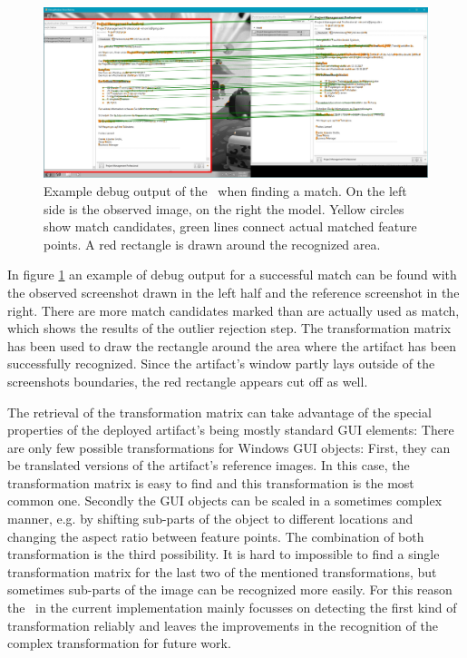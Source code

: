 \begin{figure}[h!]
	\centering
	\includegraphics[scale=0.23]{fig/example-debug-output.jpg}
	\caption{Example debug output of the \vd~when finding a match. On the left side is the observed image, on the right the model. Yellow circles show match candidates, green lines connect actual matched feature points. A red rectangle is drawn around the recognized area.}\label{fig:example-debug-output}
\end{figure}

In figure \ref{fig:example-debug-output} an example of debug output for a successful match can be found with the observed screenshot drawn in the left half and the reference screenshot in the right. There are more match candidates marked than are actually used as match, which shows the results of the outlier rejection step. The transformation matrix has been used to draw the rectangle around the area where the artifact has been successfully recognized. Since the artifact's window partly lays outside of the screenshots boundaries, the red rectangle appears cut off as well.

The retrieval of the transformation matrix can take advantage of the special properties of the deployed artifact's being mostly standard GUI elements: There are only few possible transformations for Windows GUI objects: First, they can be translated versions of the artifact's reference images. In this case, the transformation matrix is easy to find and this transformation is the most common one. Secondly the GUI objects can be scaled in a sometimes complex manner, e.g. by shifting sub-parts of the object to different locations and changing the aspect ratio between feature points. The combination of both transformation is the third possibility. It is hard to impossible to find a single transformation matrix for the last two of the mentioned transformations, but sometimes sub-parts of the image can be recognized more easily. For this reason the \vd~in the current implementation mainly focusses on detecting the first kind of transformation reliably and leaves the improvements in the recognition of the complex transformation for future work.

